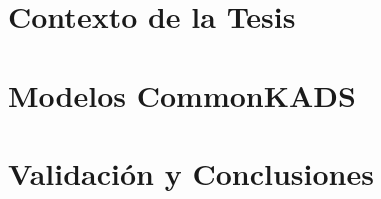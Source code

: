 \documentclass[12pt,a4paper,footinclude=true,headinclude=true,spanish]{scrbook}
\newcommand*{\ruta}{/gcca/hogar/Dropbox/gcca/gueco/doc/expo/tesis}%
\begin{document}
\newpage
\listoftodos




\cleardoublepage\part{Contexto de la Tesis}




\cleardoublepage\part{Modelos CommonKADS}







\cleardoublepage\part{Validación y Conclusiones}







\printglossaries
\end{document}
